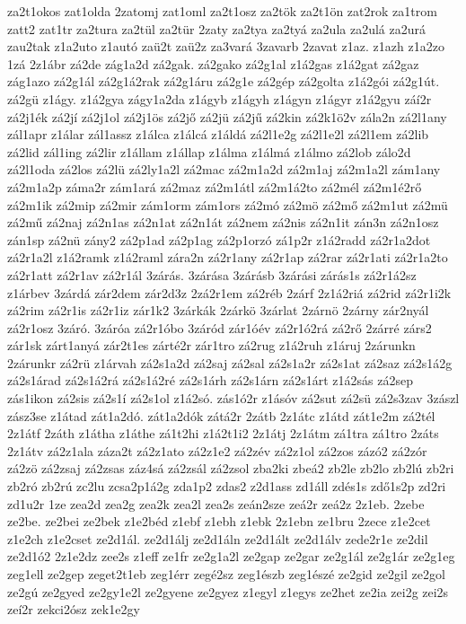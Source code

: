 {za2t1okos
zat1olda
2zatomj
zat1oml
za2t1osz
za2tök
za2t1ön
zat2rok
za1trom
zatt2
zat1tr
za2tura
za2tül
za2tür
2zaty
za2tya
za2tyá
za2ula
za2ulá
za2urá
zau2tak
z1a2uto
z1autó
zaü2t
zaü2z
za3vará
3zavarb
2zavat
z1az.
z1azh
z1a2zo
1zá
2z1ábr
zá2de
zág1a2d
zá2gak.
zá2gako
zá2g1al
z1á2gas
z1á2gat
zá2gaz
zág1azo
zá2g1ál
zá2g1á2rak
zá2g1áru
zá2g1e
zá2gép
zá2golta
z1á2gói
zá2g1út.
zá2gü
z1ágy.
z1á2gya
zágy1a2da
z1ágyb
z1ágyh
z1ágyn
z1ágyr
z1á2gyu
záí2r
zá2j1ék
zá2jí
zá2j1ol
zá2j1ös
zá2jő
zá2jü
zá2jű
zá2kin
zá2k1ö2v
zála2n
zá2l1any
zál1apr
z1álar
zál1assz
z1álca
z1álcá
z1áldá
zá2l1e2g
zá2l1e2l
zá2l1em
zá2lib
zá2lid
zál1ing
zá2lir
z1állam
z1állap
z1álma
z1álmá
z1álmo
zá2lob
zálo2d
zá2l1oda
zá2los
zá2lü
zá2ly1a2l
zá2mac
zá2m1a2d
zá2m1aj
zá2m1a2l
zám1any
zá2m1a2p
záma2r
zám1ará
zá2maz
zá2m1átl
zá2m1á2to
zá2mél
zá2m1é2rő
zá2m1ik
zá2mip
zá2mir
zám1orm
zám1ors
zá2mó
zá2mö
zá2mő
zá2m1ut
zá2mü
zá2mű
zá2naj
zá2n1as
zá2n1at
zá2n1át
zá2nem
zá2nis
zá2n1it
zán3n
zá2n1osz
zán1sp
zá2nü
zány2
zá2p1ad
zá2p1ag
zá2p1orzó
zá1p2r
z1á2radd
zá2r1a2dot
zá2r1a2l
z1á2ramk
z1á2raml
zára2n
zá2r1any
zá2r1ap
zá2rar
zá2r1ati
zá2r1a2to
zá2r1att
zá2r1av
zá2r1ál
3zárás.
3zárása
3zárásb
3zárási
zárás1s
zá2r1á2sz
z1árbev
3zárdá
zár2dem
zár2d3z
2zá2r1em
zá2réb
2zárf
2z1á2riá
zá2rid
zá2r1i2k
zá2rim
zá2r1is
zá2r1iz
zár1k2
3zárkák
2zárkö
3zárlat
2zárnö
2zárny
zár2nyál
zá2r1osz
3záró.
3záróa
zá2r1óbo
3záród
zár1óév
zá2r1ó2rá
zá2rő
2zárré
zárs2
zár1sk
zárt1anyá
zár2t1es
zárté2r
zár1tro
zá2rug
z1á2ruh
z1áruj
2zárunkn
2zárunkr
zá2rü
z1árvah
zá2s1a2d
zá2saj
zá2sal
zá2s1a2r
zá2s1at
zá2saz
zá2s1á2g
zá2s1árad
zá2s1á2rá
zá2s1á2ré
zá2s1árh
zá2s1árn
zá2s1árt
z1á2sás
zá2sep
zás1ikon
zá2sis
zá2s1í
zá2s1ol
z1á2só.
zás1ó2r
z1ásóv
zá2sut
zá2sü
zá2s3zav
3zászl
zász3se
z1átad
zát1a2dó.
zát1a2dók
zátá2r
2zátb
2z1átc
z1átd
zát1e2m
zá2tél
2z1átf
2záth
z1átha
z1áthe
zá1t2hi
z1á2t1i2
2z1átj
2z1átm
zá1tra
zá1tro
2záts
2z1átv
zá2z1ala
záza2t
zá2z1ato
zá2z1e2
zá2zév
zá2z1ol
zá2zos
zázó2
zá2zór
zá2zö
zá2zsaj
zá2zsas
záz4sá
zá2zsál
zá2zsol
zba2ki
zbeá2
zb2le
zb2lo
zb2lú
zb2ri
zb2ró
zb2rú
zc2lu
zcsa2p1á2g
zda1p2
zdas2
z2d1ass
zd1áll
zdés1s
zdő1s2p
zd2ri
zd1u2r
1ze
zea2d
zea2g
zea2k
zea2l
zea2s
zeán2sze
zeá2r
zeá2z
2z1eb.
2zebe
ze2be.
ze2bei
ze2bek
z1e2béd
z1ebf
z1ebh
z1ebk
2z1ebn
ze1bru
2zece
z1e2cet
z1e2ch
z1e2cset
ze2d1ál.
ze2d1álj
ze2d1áln
ze2d1ált
ze2d1álv
zede2r1e
ze2dil
ze2d1ó2
2z1e2dz
zee2s
z1eff
ze1fr
ze2g1a2l
ze2gap
ze2gar
ze2g1ál
ze2g1ár
ze2g1eg
zeg1ell
ze2gep
zeget2t1eb
zeg1érr
zegé2sz
zeg1észb
zeg1észé
ze2gid
ze2gil
ze2gol
ze2gú
ze2gyed
ze2gy1e2l
ze2gyene
ze2gyez
z1egyl
z1egys
ze2het
ze2ia
zei2g
zei2s
zeí2r
zekci2ósz
zek1e2gy
}

